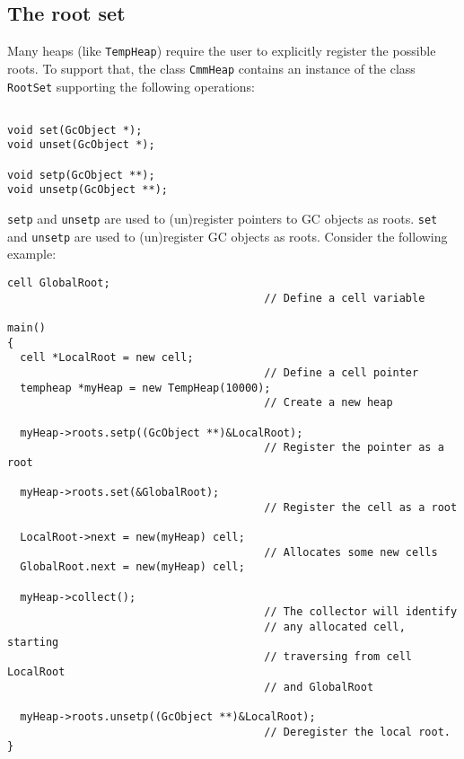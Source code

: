 \subsection{The root set}

Many heaps (like {\tt TempHeap}) require the user to explicitly
register the possible roots.
To support that, the class {\tt CmmHeap} contains an instance of the class
{\tt RootSet} supporting the following operations:

\begin{verbatim}

void set(GcObject *);
void unset(GcObject *);

void setp(GcObject **);
void unsetp(GcObject **);
\end{verbatim}

{\tt setp} and {\tt unsetp} are used to (un)register pointers
to GC objects as roots.
{\tt set} and {\tt unsetp} are used to (un)register GC objects
as roots.
Consider the following example:

\begin{verbatim}
cell GlobalRoot;                            
                                        // Define a cell variable

main()
{
  cell *LocalRoot = new cell;               
                                        // Define a cell pointer
  tempheap *myHeap = new TempHeap(10000); 
                                        // Create a new heap

  myHeap->roots.setp((GcObject **)&LocalRoot);  
                                        // Register the pointer as a root

  myHeap->roots.set(&GlobalRoot);           
                                        // Register the cell as a root

  LocalRoot->next = new(myHeap) cell;   
                                        // Allocates some new cells
  GlobalRoot.next = new(myHeap) cell;

  myHeap->collect();                        
                                        // The collector will identify
                                        // any allocated cell, starting
                                        // traversing from cell LocalRoot
                                        // and GlobalRoot

  myHeap->roots.unsetp((GcObject **)&LocalRoot);
                                        // Deregister the local root.
}
\end{verbatim}

